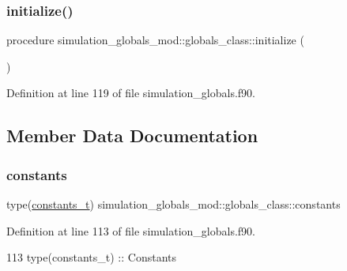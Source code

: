 \subsubsection{\texorpdfstring{initialize()}{initialize()}}
{\footnotesize\ttfamily procedure simulation\+\_\+globals\+\_\+mod\+::globals\+\_\+class\+::initialize (\begin{DoxyParamCaption}{ }\end{DoxyParamCaption})\hspace{0.3cm}{\ttfamily [private]}}



Definition at line 119 of file simulation\+\_\+globals.\+f90.



\subsection{Member Data Documentation}
\mbox{\label{structsimulation__globals__mod_1_1globals__class_af178aeb39fefa2c7dec6a74faa04819c}} 
\subsubsection{\texorpdfstring{constants}{constants}}
{\footnotesize\ttfamily type(\mbox{\hyperlink{structsimulation__globals__mod_1_1constants__t}{constants\+\_\+t}}) simulation\+\_\+globals\+\_\+mod\+::globals\+\_\+class\+::constants\hspace{0.3cm}{\ttfamily [private]}}



Definition at line 113 of file simulation\+\_\+globals.\+f90.


\begin{DoxyCode}
113         \textcolor{keywordtype}{type}(constants\_t)   :: Constants
\end{DoxyCode}
\mbox{\label{structsimulation__globals__mod_1_1globals__class_a78946a154e6d498c1883c9280d4ca404}} 
